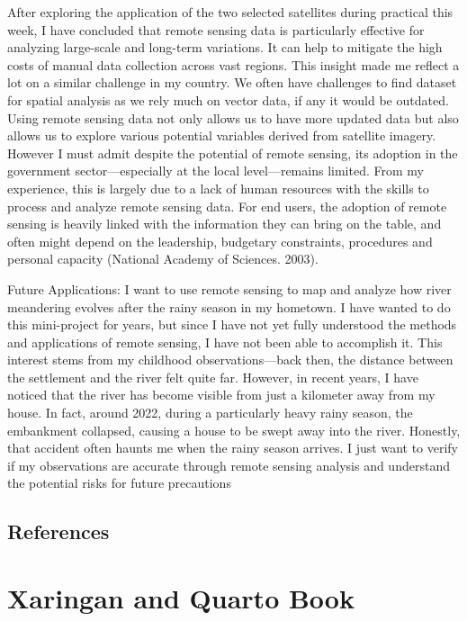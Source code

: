 \documentclass[
  letterpaper,
  DIV=11,
  numbers=noendperiod]{scrreprt}
\begin{document}
After exploring the application of the two selected satellites during
practical this week, I have concluded that remote sensing data is
particularly effective for analyzing large-scale and long-term
variations. It can help to mitigate the high costs of manual data
collection across vast regions. This insight made me reflect a lot on a
similar challenge in my country. We often have challenges to find
dataset for spatial analysis as we rely much on vector data, if any it
would be outdated. Using remote sensing data not only allows us to have
more updated data but also allows us to explore various potential
variables derived from satellite imagery. However I must admit despite
the potential of remote sensing, its adoption in the government
sector---especially at the local level---remains limited. From my
experience, this is largely due to a lack of human resources with the
skills to process and analyze remote sensing data. For end users, the
adoption of remote sensing is heavily linked with the information they
can bring on the table, and often might depend on the leadership,
budgetary constraints, procedures and personal capacity (National
Academy of Sciences. 2003).

Future Applications: I want to use remote sensing to map and analyze how
river meandering evolves after the rainy season in my hometown. I have
wanted to do this mini-project for years, but since I have not yet fully
understood the methods and applications of remote sensing, I have not
been able to accomplish it. This interest stems from my childhood
observations---back then, the distance between the settlement and the
river felt quite far. However, in recent years, I have noticed that the
river has become visible from just a kilometer away from my house. In
fact, around 2022, during a particularly heavy rainy season, the
embankment collapsed, causing a house to be swept away into the river.
Honestly, that accident often haunts me when the rainy season arrives. I
just want to verify if my observations are accurate through remote
sensing analysis and understand the potential risks for future
precautions

\hypertarget{references}{%
\section{References}\label{references}}


\hypertarget{xaringan-and-quarto-book}{%
\chapter{Xaringan and Quarto Book}\label{xaringan-and-quarto-book}}
\end{document}
